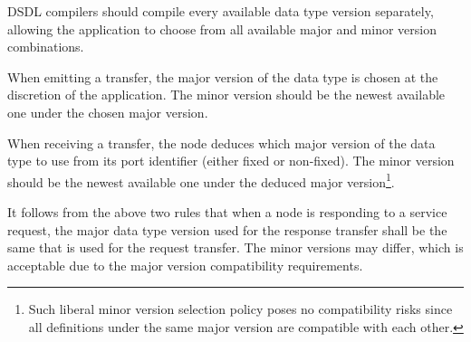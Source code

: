 DSDL compilers should compile every available data type version separately,
allowing the application to choose from all available major and minor version combinations.

When emitting a transfer, the major version of the data type is chosen at the discretion of the application.
The minor version should be the newest available one under the chosen major version.

When receiving a transfer, the node deduces which major version of the data type to use
from its port identifier (either fixed or non-fixed).
The minor version should be the newest available one under the deduced major version\footnote{%
Such liberal minor version selection policy poses no compatibility risks since all definitions under the same
major version are compatible with each other.}.

It follows from the above two rules that when a node is responding to a service request,
the major data type version used for the response transfer shall be the same that is used for the request transfer.
The minor versions may differ, which is acceptable due to the major version compatibility requirements.


